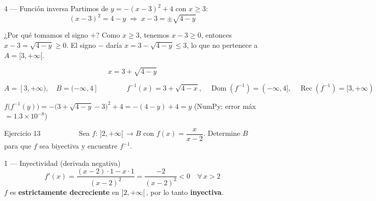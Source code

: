 \documentclass[letterpaper, 11pt]{article}
\begin{document}
\begin{paso}{4 — Función inversa}
Partimos de $y = -(x-3)^2+4$ con $x\geq 3$:
\[
    (x-3)^2 = 4-y
    \;\Longrightarrow\;
    x-3 = \pm\sqrt{4-y}
\]
\begin{justif}{¿Por qué tomamos el signo $+$?}
Como $x\geq 3$, tenemos $x-3\geq 0$, entonces $x-3=\sqrt{4-y}\geq 0$.
El signo $-$ daría $x=3-\sqrt{4-y}\leq 3$, lo que no pertenece a $A=[3,+\infty[$.
\end{justif}
\[
    \boxed{x = 3+\sqrt{4-y}}
\]
\end{paso}

\begin{resultado}
\[
    A=[3,+\infty),\quad B=(-\infty,4]
    \qquad\qquad
    f^{-1}(x) = 3+\sqrt{4-x},\quad
    \operatorname{Dom}(f^{-1})=(-\infty,4],\quad
    \operatorname{Rec}(f^{-1})=[3,+\infty)
\]
\end{resultado}

\begin{verificacion}
$f\bigl(f^{-1}(y)\bigr)
= -\bigl(3+\sqrt{4-y}-3\bigr)^2+4
= -(4-y)+4
= y$ \checkmark\quad
(NumPy: error máx $= 1.3\times10^{-8}$)
\end{verificacion}

\newpage

\begin{enunciado}{Ejercicio 13 \hfill \normalsize\textcolor{white}{[Avanzado]}}
Sea $f:\,]2,+\infty[\,\to B$ con $f(x)=\dfrac{x}{x-2}$.
Determine $B$ para que $f$ sea biyectiva y encuentre $f^{-1}$.
\end{enunciado}

\begin{paso}{1 — Inyectividad (derivada negativa)}
\[
    f'(x) = \frac{(x-2)\cdot 1 - x\cdot 1}{(x-2)^2}
          = \frac{-2}{(x-2)^2} < 0 \quad \forall\, x>2
\]
$f$ es \textbf{estrictamente decreciente} en $]2,+\infty[\,$, por lo tanto \textbf{inyectiva}.
\end{paso}
\end{document}
